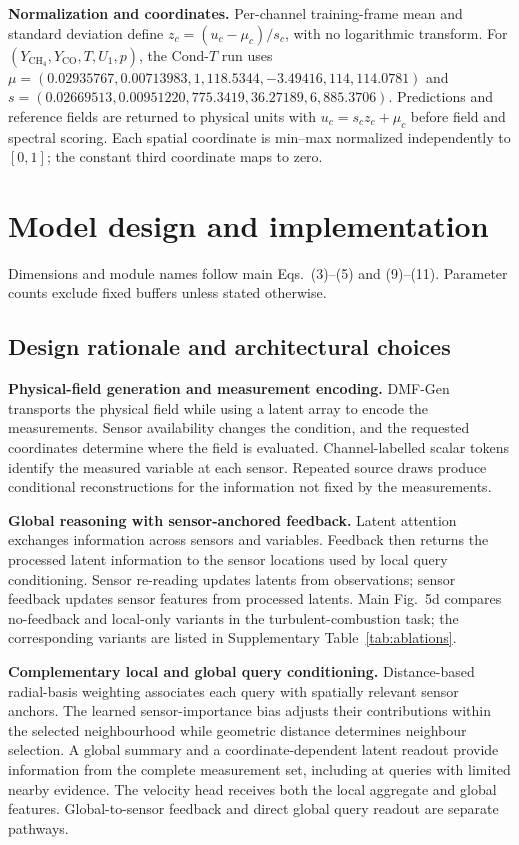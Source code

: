 \documentclass[11pt]{article}
\newcommand{\sisubsection}[1]{%
\FloatBarrier
\Needspace{5\baselineskip}%
\subsection{#1}%
}
\newcommand{\detail}[1]{\par\Needspace{4\baselineskip}\textbf{#1}\enspace}
\begin{document}
\detail{Normalization and coordinates.} Per-channel training-frame mean and standard deviation define $z_c=(u_c-\mu_c)/s_c$, with no logarithmic transform. For $(Y_{\mathrm{CH_4}},Y_{\mathrm{CO}},T,U_1,p)$, the Cond-$T$ run uses $\mu=(0.02935767,0.00713983,1{,}118.5344,-3.49416,114{,}114.0781)$ and $s=(0.02669513,0.00951220,775.3419,36.27189,6{,}885.3706)$. Predictions and reference fields are returned to physical units with $u_c=s_cz_c+\mu_c$ before field and spectral scoring. Each spatial coordinate is min--max normalized independently to $[0,1]$; the constant third coordinate maps to zero.

\FloatBarrier
{}
\section{Model design and implementation}
\label{sec:model}
Dimensions and module names follow main Eqs.~(3)--(5) and (9)--(11). Parameter counts exclude fixed buffers unless stated otherwise.

\sisubsection{Design rationale and architectural choices}
\label{subsec:design-rationale}

\detail{Physical-field generation and measurement encoding.} DMF-Gen transports the physical field while using a latent array to encode the measurements. Sensor availability changes the condition, and the requested coordinates determine where the field is evaluated. Channel-labelled scalar tokens identify the measured variable at each sensor. Repeated source draws produce conditional reconstructions for the information not fixed by the measurements.

\detail{Global reasoning with sensor-anchored feedback.} Latent attention exchanges information across sensors and variables. Feedback then returns the processed latent information to the sensor locations used by local query conditioning. Sensor re-reading updates latents from observations; sensor feedback updates sensor features from processed latents. Main Fig.~5d compares no-feedback and local-only variants in the turbulent-combustion task; the corresponding variants are listed in Supplementary Table~\ref{tab:ablations}.

\detail{Complementary local and global query conditioning.} Distance-based radial-basis weighting associates each query with spatially relevant sensor anchors. The learned sensor-importance bias adjusts their contributions within the selected neighbourhood while geometric distance determines neighbour selection. A global summary and a coordinate-dependent latent readout provide information from the complete measurement set, including at queries with limited nearby evidence. The velocity head receives both the local aggregate and global features. Global-to-sensor feedback and direct global query readout are separate pathways.
\end{document}
